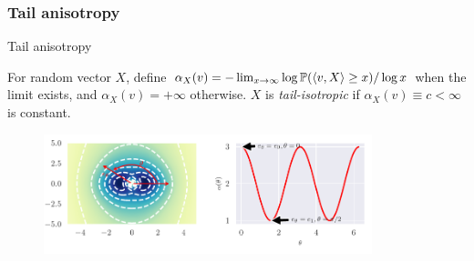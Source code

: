\subsubsection{Tail anisotropy}

\begin{frame}{Tail anisotropy}
    \begin{definition}
      \label{def:mv-tail-param}
      For random vector $X$, define
      $\alpha_X(v) = -\lim_{x \to \infty} \log \mathbb{P}(\braket{v,X} \geq x) / \log x$ when the limit exists, and $\alpha_X(v) = +\infty$ otherwise.
      $X$ is \emph{tail-isotropic} if $\alpha_X(v) \equiv c < \infty$ is constant.
    \end{definition}

    \begin{figure}[htbp]
  \centering
  \includegraphics[width=0.85\textwidth]{Figures/ftvi/radial-fat-tail.pdf}%
  \label{fig:radial-fat-tail}
\end{figure}
\end{frame}


